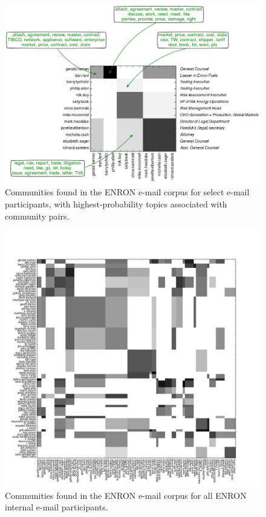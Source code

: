         \begin{figure}[p]
          \begin{center}
          \includegraphics[width=\textwidth]{fig_networktopic/EnronClusters.png}
          \caption{Communities found in the ENRON e-mail corpus for select e-mail participants, with highest-probability topics associated with community pairs.}
          \label{fig:enron_topics}
          \end{center}
        \end{figure}
        
        \begin{figure}[p]
          \begin{center}
          \includegraphics[width=\textwidth]{fig_networktopic/Enron_v2_network_rates.png}
          \caption{Communities found in the ENRON e-mail corpus for all ENRON internal e-mail participants.}
          \label{fig:enron_topics_full}
          \end{center}
        \end{figure}
    
